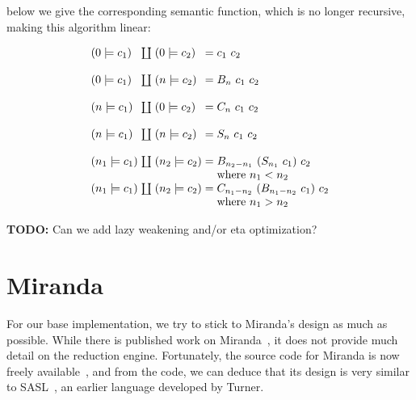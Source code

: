 \documentclass[conference]{IEEEtran}
\begin{document}
below we give the corresponding semantic function, which is no longer recursive, making this algorithm linear:

\begin{equation*}
    \arraycolsep=1.4pt
    \begin{array}{l l l l l}
        (0 \models c_1)   & \coprod & (0 \models c_2)   & = & c_1 \ c_2                               \\
        \\
        (0 \models c_1)   & \coprod & (n \models c_2)   & = & B_n \ c_1 \ c_2                         \\
        \\
        (n \models c_1)   & \coprod & (0 \models c_2)   & = & C_n \ c_1 \ c_2                         \\
        \\
        (n \models c_1)   & \coprod & (n \models c_2)   & = & S_n \ c_1 \ c_2                         \\
        \\
        (n_1 \models c_1) & \coprod & (n_2 \models c_2) & = & B_{n_2-n_1} \ (S_{n_1} \ c_1) \ c_2     \\
                          &         &                   &   & \text{where } n_1 < n_2                 \\
        (n_1 \models c_1) & \coprod & (n_2 \models c_2) & = & C_{n_1-n_2} \ (B_{n_1-n_2} \ c_1) \ c_2 \\
                          &         &                   &   & \text{where } n_1 > n_2                 \\
    \end{array}
\end{equation*}

\textbf{TODO: } Can we add lazy weakening and/or eta optimization?

\section{Miranda}
\label{sec:miranda}
For our base implementation, we try to stick to Miranda's design as much as possible.
While there is published work on Miranda~\cite{turner_miranda_1985}, it does not provide much detail on the reduction engine.
Fortunately, the source code for Miranda is now freely available~\cite{noauthor_open_2021}, and from the code, we can deduce that its design is very similar to SASL~\cite{turner_new_1979}, an earlier language developed by Turner.
\end{document}
